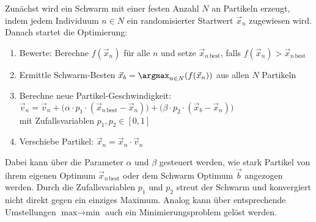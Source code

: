 Zunächst wird ein Schwarm mit einer festen Anzahl $N$ an Partikeln erzeugt, indem jedem Individuum $n \in N$ ein randomisierter Startwert $\vec{x}_n$ zugewiesen wird.
Danach startet die Optimierung:
\begin{enumerate}
	\item Bewerte: Berechne $f(\vec{x}_n)$ für alle $n$ und setze $\vec{x}_{n\,\text{best}}$, falls $f(\vec{x}_n) > \vec{x}_{n\,\text{best}}$
	\item Ermittle Schwarm-Besten $\vec{x}_b = \argmax_{n \in N} (f(\vec{x}_n))$ aus allen $N$ Partikeln
	\item Berechne neue Partikel-Geschwindigkeit: \\
	$\vec{v}_n = \vec{v}_n 
	+ \big( \alpha \cdot p_1 \cdot (\vec{x}_{n\,\text{best}} -  \vec{x}_n ) \big) 
	+ \big( \beta \cdot p_2 \cdot (\vec{x}_b - \vec{x}_n) \big)$ \\
	mit Zufallsvariablen $p_1, p_2 \in [0, 1]$
	\item Verschiebe Partikel: $\vec{x}_n = \vec{x}_n \cdot \vec{v}_n$
\end{enumerate}
Dabei kann über die Parameter $\alpha$ und $\beta$ gesteuert werden, wie stark Partikel von ihrem eigenen Optimum $\vec{x}_{n\,\text{best}}$ oder dem Schwarm Optimum $\vec{b}$ angezogen werden.
Durch die Zufallsvariablen $p_1$ und $p_2$ streut der Schwarm und konvergiert nicht direkt gegen ein einziges Maximum.
Analog kann über entsprechende Umstellungen $\text{max} \to \text{min}$ auch ein Minimierungsproblem gelöst werden.


